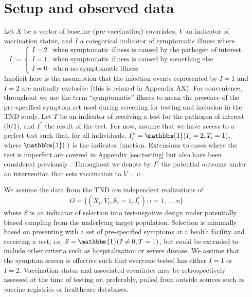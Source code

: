 \documentclass[11pt]{article}
\begin{document}
\section{Setup and observed data} \label{sec:setup}
Let $X$ be a vector of baseline (pre-vaccination) covariates, $V$ an indicator of vaccination status, and $I$ a categorical indicator of symptomatic illness where
        $$I := \begin{cases} 
        I = 2 & \text{when symptomatic illness is caused by the pathogen of interest} \\
        I = 1 & \text{when symptomatic illness is caused by something else} \\
        I = 0 & \text{when no symptomatic illness}
        \end{cases}$$
 Implicit here is the assumption that the infection events represented by $I = 1$ and $I = 2$ are mutually exclusive (this is relaxed in Appendix AX). For convenience, throughout we use the term ``symptomatic'' illness to mean the presence of the pre-specified symptom set used during screening for testing and inclusion in the TND study. Let $T$ be an indicator of receiving a test for the pathogen of interest (0/1), and $I^*$ the result of the test. For now, assume that we have access to a perfect test such that, for all individuals, $I^*_i = \mathbbm{1}(I_i = 2, T_i = 1)$, where $\mathbbm{1}(\cdot)$ is the indicator function. Extensions to cases where the test is imperfect are covered in Appendix \ref{sec:testing} but also have been considered previously \cite{jackson2015effects, sullivan_theoretical_2016}. Throughout we denote by $I^v$ the potential outcome under an intervention that sets vaccination to $V=v$. 
    
We assume the data from the TND are independent realizations of 
$$O = \{(X_i, V_i, S_i = 1, I^*_i) : i = 1, \ldots, n\}$$
where $S$ is an indicator of selection into test-negative design under potentially biased sampling from the underlying target population. Selection is minimally based on presenting with a set of pre-specified symptoms at a health facility and receiving a test, i.e. $S = \mathbbm{1}(I \neq 0, T = 1)$, but could be extended to include other criteria such as hospitalization or severe disease. We assume that the symptom screen is effective such that everyone tested has either $I=1$ or $I=2$. Vaccination status and associated covariates may be retrospectively assessed at the time of testing or, preferably, pulled from outside sources such as vaccine registries or healthcare databases. 
\end{document}
